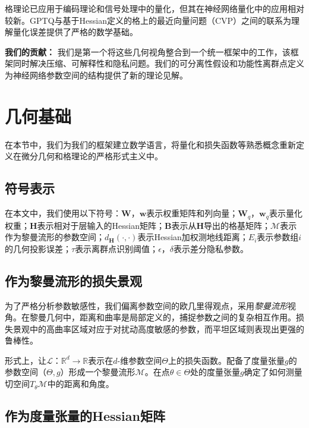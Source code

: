 \documentclass[letterpaper,twocolumn,10pt]{article}
\begin{document}
格理论已应用于编码理论和信号处理中的量化，但其在神经网络量化中的应用相对较新。GPTQ与基于Hessian定义的格上的最近向量问题（CVP）之间的联系\cite{frantar2022gptq}为理解量化误差提供了严格的数学基础。

\textbf{我们的贡献：} 我们是第一个将这些几何视角整合到一个统一框架中的工作，该框架同时解决压缩、可解释性和隐私问题。我们的可分离性假设和功能性离群点定义为神经网络参数空间的结构提供了新的理论见解。

\section{几何基础}
\label{sec:background}

在本节中，我们为我们的框架建立数学语言，将量化和损失函数等熟悉概念重新定义在微分几何和格理论的严格形式主义中。

\subsection{符号表示}

在本文中，我们使用以下符号：$\mathbf{W}，\mathbf{w}$表示权重矩阵和列向量；$\mathbf{W}_q，\mathbf{w}_q$表示量化权重；$\mathbf{H}$表示相对于层输入的Hessian矩阵；$\mathbf{B}$表示从$\mathbf{H}$导出的格基矩阵；$\mathcal{M}$表示作为黎曼流形的参数空间；$d_{\mathbf{H}}(\cdot, \cdot)$表示Hessian加权测地线距离；$E_i$表示参数组$i$的几何投影误差；$\tau$表示离群点识别阈值；$\epsilon，\delta$表示差分隐私参数。

\subsection{作为黎曼流形的损失景观}

为了严格分析参数敏感性，我们偏离参数空间的欧几里得观点，采用\emph{黎曼流形}视角。在黎曼几何中，距离和曲率是局部定义的，捕捉参数之间的复杂相互作用。损失景观中的高曲率区域对应于对扰动高度敏感的参数，而平坦区域则表现出更强的鲁棒性。

形式上，让$\mathcal{L}：\mathbb{R}^d \to \mathbb{R}$表示在$d$-维参数空间$\Theta$上的损失函数。配备了度量张量$g$的参数空间$（\Theta, g）$形成一个黎曼流形$\mathcal{M}$。在点$\theta \in \Theta$处的度量张量$g$确定了如何测量切空间$T_\theta \mathcal{M}$中的距离和角度。

\subsection{作为度量张量的Hessian矩阵}
\end{document}
